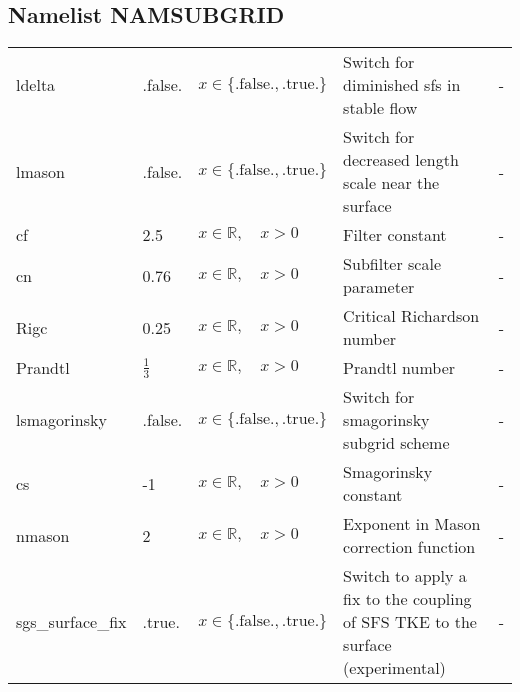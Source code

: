 \documentclass[twoside,11pt,fleqn,a4paper,english,openright]{report}
\begin{document}
\subsection{Namelist NAMSUBGRID}\label{par:subgrid}

\begin{center}
  \tablelasttail{
        &&&&\\\hline
  }
\begin{supertabular}{|l|p{1.6cm}|p{4cm}|p{6cm}|l|}
  ldelta	& .false.	& $x\in\{\text{.false.},\text{.true.}\}$	& Switch for diminished sfs in stable flow		& -\\
  lmason	& .false.	& $x\in\{\text{.false.},\text{.true.}\}$	& Switch for decreased length scale near the surface	& -\\
  cf		& 2.5		& $x \in \mathbb{R}, \quad x>0$	& Filter constant					& -\\
  cn		& 0.76		& $x \in \mathbb{R}, \quad x>0$	& Subfilter scale parameter				& -\\
  Rigc		& 0.25		& $x \in \mathbb{R}, \quad x>0$	& Critical Richardson number				& -\\
  Prandtl	& $\frac{1}{3}$	& $x \in \mathbb{R}, \quad x>0$	& Prandtl number					& -\\
  lsmagorinsky & .false.& $x\in\{\text{.false.},\text{.true.}\}$	& Switch for smagorinsky subgrid scheme & -\\
  cs	& -1	& $x \in \mathbb{R}, \quad x>0$ & Smagorinsky constant	& -\\
  nmason	& 2	& $x \in \mathbb{R}, \quad x>0$ & Exponent in Mason correction function & -\\
  sgs\_surface\_fix & .true.	& $x\in\{\text{.false.},\text{.true.}\}$	& Switch to apply a fix to the coupling of SFS TKE to the surface (experimental) & - \\
\end{supertabular}
\end{center}
\end{document}
